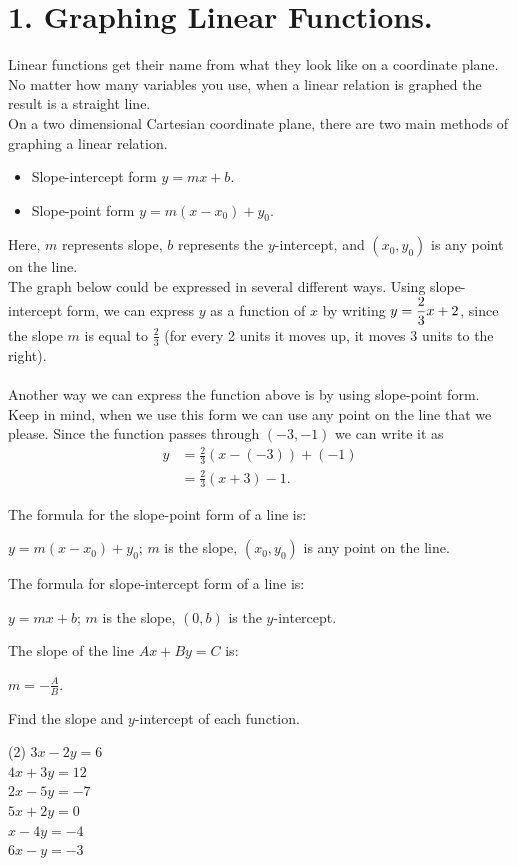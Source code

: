 \documentclass[12pt,fleqn]{book}
\newcommand{\prb}[1]{\begin{Exercise}#1\end{Exercise}}
\newcommand{\sol}[1]{\begin{Answer}#1\end{Answer}}
\begin{document}
\chapter{1. Graphing Linear Functions.}
Linear functions get their name from what they look like on a coordinate plane.  No matter how many variables you use, when a linear relation is graphed the result is a straight line.
\\[1em]
On a two dimensional Cartesian coordinate plane, there are two main methods of graphing a linear relation.
\begin{itemize}
	\item Slope-intercept form $y=mx+b$.
	\item Slope-point form $y=m(x-x_0)+y_0$.
\end{itemize}
Here, $m$ represents slope, $b$ represents the $y$-intercept, and $(x_0,y_0)$ is any point on the line.
\\[1em]
The graph below could be expressed in several different ways.  Using slope-intercept form, we can express $y$ as a function of $x$ by writing $\displaystyle y=\frac 23 x +2$, since the slope $m$ is equal to $\frac 23$ (for every 2 units it moves up, it moves 3 units to the right).
\\[1em]
\\[1em]
Another way we can express the function above is by using slope-point form.  Keep in mind, when we use this form we can use any point on the line that we please.  Since the function passes through $(-3,-1)$ we can write it as
\begin{align*}
	y & =\frac 23 (x-(-3))+(-1) \\
	  & =\frac 23 (x+3)-1.
\end{align*}
\clearpage
\prb{The formula for the slope-point form of a line is:}
\sol{$y=m(x-x_0)+y_0$; $m$ is the slope, $(x_0,y_0)$ is any point on the line.}
\vfill
\prb{The formula for slope-intercept form of a line is: }
\sol{$y=mx+b$; $m$ is the slope, $(0,b)$ is the $y$-intercept.}
\vfill 
\prb{The slope of the line $Ax+By=C$ is:}
\sol{$m=-\frac AB$.}
\vfill
\prb{Find the slope and $y$-intercept of each function.
	\begin{tasks}(2)
		\task $3x-2y=6$		\\[4em]
		\task $4x+3y=12$	\\[4em]
		\task $2x-5y=-7$ 	\\[4em]
		\task $5x+2y=0$ 	\\[4em]
		\task $x-4y=-4$ 	\\[4em]
		\task $6x-y=-3$ 	\\[4em]
	\end{tasks}
}
\end{document}
